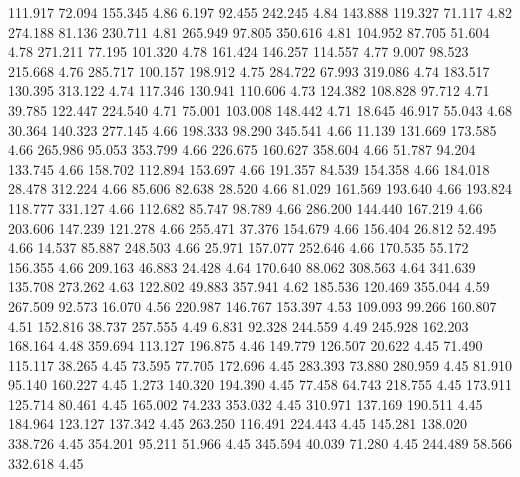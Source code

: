  111.917   72.094  155.345         4.86
   6.197   92.455  242.245         4.84
 143.888  119.327   71.117         4.82
 274.188   81.136  230.711         4.81
 265.949   97.805  350.616         4.81
 104.952   87.705   51.604         4.78
 271.211   77.195  101.320         4.78
 161.424  146.257  114.557         4.77
   9.007   98.523  215.668         4.76
 285.717  100.157  198.912         4.75
 284.722   67.993  319.086         4.74
 183.517  130.395  313.122         4.74
 117.346  130.941  110.606         4.73
 124.382  108.828   97.712         4.71
  39.785  122.447  224.540         4.71
  75.001  103.008  148.442         4.71
  18.645   46.917   55.043         4.68
  30.364  140.323  277.145         4.66
 198.333   98.290  345.541         4.66
  11.139  131.669  173.585         4.66
 265.986   95.053  353.799         4.66
 226.675  160.627  358.604         4.66
  51.787   94.204  133.745         4.66
 158.702  112.894  153.697         4.66
 191.357   84.539  154.358         4.66
 184.018   28.478  312.224         4.66
  85.606   82.638   28.520         4.66
  81.029  161.569  193.640         4.66
 193.824  118.777  331.127         4.66
 112.682   85.747   98.789         4.66
 286.200  144.440  167.219         4.66
 203.606  147.239  121.278         4.66
 255.471   37.376  154.679         4.66
 156.404   26.812   52.495         4.66
  14.537   85.887  248.503         4.66
  25.971  157.077  252.646         4.66
 170.535   55.172  156.355         4.66
 209.163   46.883   24.428         4.64
 170.640   88.062  308.563         4.64
 341.639  135.708  273.262         4.63
 122.802   49.883  357.941         4.62
 185.536  120.469  355.044         4.59
 267.509   92.573   16.070         4.56
 220.987  146.767  153.397         4.53
 109.093   99.266  160.807         4.51
 152.816   38.737  257.555         4.49
   6.831   92.328  244.559         4.49
 245.928  162.203  168.164         4.48
 359.694  113.127  196.875         4.46
 149.779  126.507   20.622         4.45
  71.490  115.117   38.265         4.45
  73.595   77.705  172.696         4.45
 283.393   73.880  280.959         4.45
  81.910   95.140  160.227         4.45
   1.273  140.320  194.390         4.45
  77.458   64.743  218.755         4.45
 173.911  125.714   80.461         4.45
 165.002   74.233  353.032         4.45
 310.971  137.169  190.511         4.45
 184.964  123.127  137.342         4.45
 263.250  116.491  224.443         4.45
 145.281  138.020  338.726         4.45
 354.201   95.211   51.966         4.45
 345.594   40.039   71.280         4.45
 244.489   58.566  332.618         4.45
